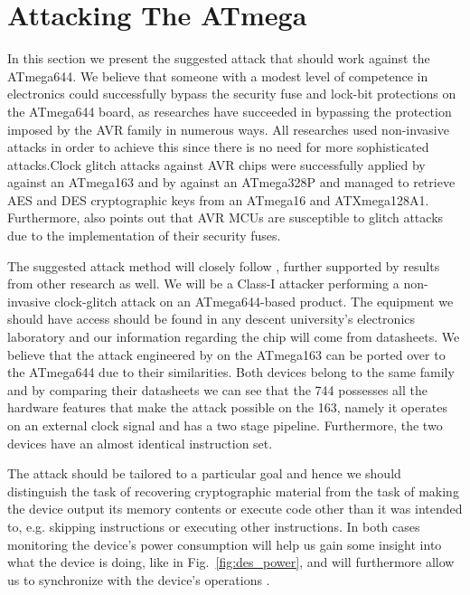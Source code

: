 \section{Attacking The ATmega}
\label{sec:attacking_mega}

In this section we present the suggested attack that should work against the ATmega644. We believe that someone with a modest level of competence in electronics could successfully bypass the security fuse and lock-bit protections on the ATmega644 board, as researches have succeeded in bypassing the protection imposed by the AVR family in numerous ways. All researches used non-invasive attacks in order to achieve this since there is no need for more sophisticated attacks.Clock glitch attacks against AVR chips were successfully applied by \citep{glitches_paper} against an ATmega163 and by \citep{chipwhisperer} against an ATmega328P and \citep{avr_mega} managed to retrieve AES and DES cryptographic keys from an ATmega16 and ATXmega128A1. Furthermore, \citep{sergei:thesis} also points out that AVR MCUs are susceptible to glitch attacks due to the implementation of their security fuses. 

The suggested attack method will closely follow \citep{glitches_paper}, further supported by results from other research as well. We will be a Class-I attacker performing a non-invasive clock-glitch attack on an ATmega644-based product. The equipment we should have access should be found in any descent university's electronics laboratory and our information regarding the chip will come from datasheets. We believe that the attack engineered by \citep{glitches_paper} on the ATmega163 can be ported over to the ATmega644 due to their similarities. Both devices belong to the same family and by comparing their datasheets we can see that the 744 possesses all the hardware features that make the attack possible on the 163, namely it operates on an external clock signal and has a two stage pipeline. Furthermore, the two devices have an almost identical instruction set.

The attack should be tailored to a particular goal and hence we should distinguish the task of recovering cryptographic material from the task of making the device output its memory contents or execute code other than it was intended to, e.g. skipping instructions or executing other instructions. In both cases monitoring the device's power consumption will help us gain some insight into what the device is doing, like in Fig.~\ref{fig:des_power}, and will furthermore allow us to synchronize with the device's operations \citep{sergei:thesis}\citep{avr_mega}. 

